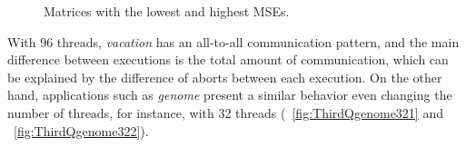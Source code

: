 \begin{figure}[!ht]
{		\label{fig:ThirdQgenome322}
	}
	\caption{Matrices with the lowest and highest MSEs.}
	\label{fig:ThirdQMatrices}
\end{figure}
With 96 threads, \emph{vacation} has an all-to-all communication pattern, and the main difference between executions is the total amount of communication, which can be explained by the difference of aborts between each execution. On the other hand, applications such as \emph{genome} present a similar behavior even changing the number of threads, for instance, with 32 threads (\figurename~\ref{fig:ThirdQgenome321} and \figurename~\ref{fig:ThirdQgenome322}).


